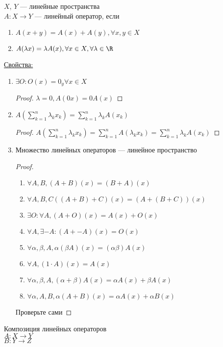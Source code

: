 \begin{Def}
$X$, $Y$ --- линейные пространства\\
$A \colon X \rightarrow Y$ --- линейный оператор, если
\begin{enumerate}
\item $A(x + y) = A(x) + A(y), \forall x, y \in X $
\item $A(\lambda x) = \lambda A(x), \forall x \in X, \forall \lambda \in \R$
\end{enumerate}
\underline{Свойства:}
\begin{enumerate}
\item $\exists O \colon O(x) = 0_y \forall x \in X$
\begin{proof}
$\lambda = 0, A(0x) = 0A(x)$
\end{proof}
\item $A(\sum_{k = 1}^n \lambda_k x_k) = \sum_{k = 1}^n \lambda_k A(x_k)$
\begin{proof}
$A(\sum_{k = 1}^n \lambda_k x_k) = \sum_{k = 1}^n A(\lambda_k x_k) = \sum_{k = 1}^n \lambda_k A(x_k)$
\end{proof}
\item Множество линейных операторов --- линейное пространство
\begin{proof}
\begin{enumerate}
\item $\forall A, B, (A + B)(x) = (B + A)(x)$
\item $\forall A, B, C ((A + B) + C)(x) = (A + (B + C))(x)$
\item $\exists O \colon \forall A, (A + O)(x) = A(x) + O(x)$
\item $\forall A, \exists -A \colon (A + -A)(x) = O(x)$
\item $\forall \alpha, \beta, A, \alpha(\beta A)(x) = (\alpha \beta)A(x)$
\item $\forall A, (1 \cdot A)(x) = A(x)$
\item $\forall \alpha, \beta, A, (\alpha + \beta)A(x) = \alpha A(x) + \beta A(x)$
\item $\forall \alpha, A, B, \alpha(A + B)(x) = \alpha A(x) + \alpha B(x)$
\end{enumerate}
Проверьте сами
\end{proof}
\end{enumerate}
\begin{Def}
Композиция линейных операторов\\
$A \colon X \rightarrow Y$ \\
$B \colon Y \rightarrow Z$ \\

\end{Def}
\end{Def}
